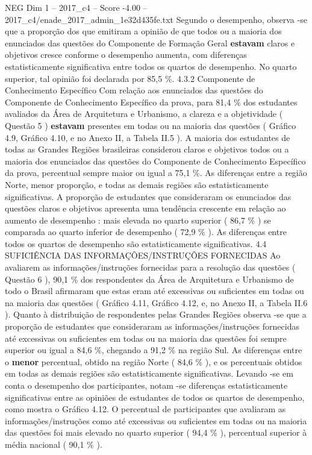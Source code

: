 \begin{textsample}{NEG Dim 1 – 2017\_c4 – Score -4.00 – 2017\_c4/enade\_2017\_admin\_1e32d435fe.txt}
Segundo o desempenho, observa -se que a proporção dos que emitiram a opinião de que todos ou a maioria dos enunciados das questões do Componente de Formação Geral \textbf{estavam} claros e objetivos cresce conforme o desempenho aumenta, com diferenças estatisticamente significativa entre todos os quartos de desempenho.
No quarto superior, tal opinião foi declarada por 85,5 \%. 4.3.2 Componente de Conhecimento Específico Com relação aos enunciados das questões do Componente de Conhecimento Específico da prova, para 81,4 \% dos estudantes avaliados da Área de Arquitetura e Urbanismo, a clareza e a objetividade ( Questão 5 ) \textbf{estavam} presentes em todas ou na maioria das questões ( Gráfico 4.9, Gráfico 4.10, e no Anexo II, a Tabela II.5 ).
A maioria dos estudantes de todas as Grandes Regiões brasileiras considerou claros e objetivos todos ou a maioria dos enunciados das questões do Componente de Conhecimento Específico da prova, percentual sempre maior ou igual a 75,1 \%.
As diferenças entre a região Norte, menor proporção, e todas as demais regiões são estatisticamente significativas.
A proporção de estudantes que consideraram os enunciados das questões claros e objetivos apresenta uma tendência crescente em relação ao aumento de desempenho : mais elevada no quarto superior ( 86,7 \% ) se comparada ao quarto inferior de desempenho ( 72,9 \% ).
As diferenças entre todos os quartos de desempenho são estatisticamente significativas. 4.4 SUFICIÊNCIA DAS INFORMAÇÕES/INSTRUÇÕES FORNECIDAS Ao avaliarem as informações/instruções fornecidas para a resolução das questões ( Questão 6 ), 90,1 \% dos respondentes da Área de Arquitetura e Urbanismo de todo o Brasil afirmaram que estas eram até excessivas ou suficientes em todas ou na maioria das questões ( Gráfico 4.11, Gráfico 4.12, e, no Anexo II, a Tabela II.6 ).
Quanto à distribuição de respondentes pelas Grandes Regiões observa -se que a proporção de estudantes que consideraram as informações/instruções fornecidas até excessivas ou suficientes em todas ou na maioria das questões foi sempre superior ou igual a 84,6 \%, chegando a 91,2 \% na região Sul.
As diferenças entre o \textbf{menor} percentual, obtido na região Norte ( 84,6 \% ), e os percentuais obtidos em todas as demais regiões são estatisticamente significativas.
Levando -se em conta o desempenho dos participantes, notam -se diferenças estatisticamente significativas entre as opiniões de estudantes de todos os quartos de desempenho, como mostra o Gráfico 4.12.
O percentual de participantes que avaliaram as informações/instruções como até excessivas ou suficientes em todas ou na maioria das questões foi mais elevado no quarto superior ( 94,4 \% ), percentual superior à média nacional ( 90,1 \% ).

\end{textsample}
